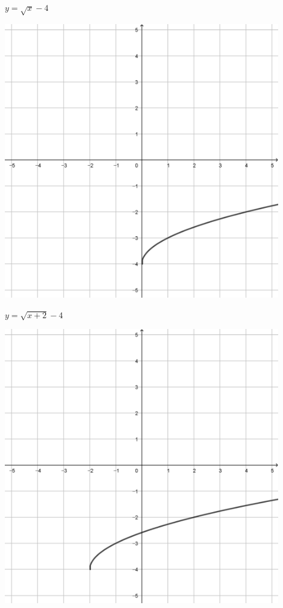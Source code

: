 \documentclass[a4paper]{oblivoir}
\begin{document}
\begin{minipage}{0.45\textwidth}\centering
\(y=\sqrt{x}-4\)
\par\bigskip\includegraphics[width=0.9\textwidth]{img/5_irrational_13}
\end{minipage}
\begin{minipage}{0.45\textwidth}\centering
\(y=\sqrt{x+2}-4\)
\par\bigskip\includegraphics[width=0.9\textwidth]{img/5_irrational_14}
\end{minipage}\bigskip\bigskip\par
\end{document}

